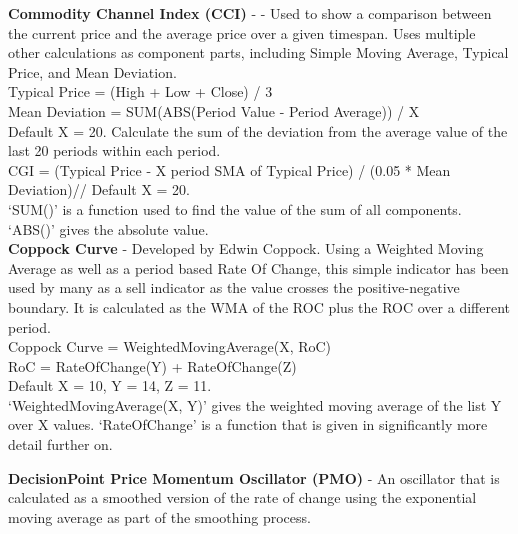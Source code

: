 \documentclass[conference]{IEEEtran}
\begin{document}

\noindent
\textbf{Commodity Channel Index (CCI)} - \cite{Lambert1980} - Used to show a comparison between the current price and the average price over a given timespan. Uses multiple other calculations as component parts, including Simple Moving Average, Typical Price, and Mean Deviation.\\

\noindent
Typical Price = (High + Low + Close) / 3\\

\noindent
Mean Deviation = SUM(ABS(Period Value - Period Average)) / X\\
Default X = 20. Calculate the sum of the deviation from the average value of the last 20 periods within each period. \\

\noindent
CGI = (Typical Price - X period SMA of Typical Price) / (0.05 * Mean Deviation)//
Default X = 20.\\

`SUM()' is a function used to find the value of the sum of all components. `ABS()' gives the absolute value.\\

\noindent
\textbf{Coppock Curve} - Developed by Edwin Coppock. Using a Weighted Moving Average as well as a period based Rate Of Change, this simple indicator has been used by many as a sell indicator as the value crosses the positive-negative boundary. It is calculated as the WMA of the ROC plus the ROC over a different period.\\

\noindent
Coppock Curve = WeightedMovingAverage(X, RoC)\\
RoC = RateOfChange(Y) + RateOfChange(Z)\\
Default X = 10, Y = 14, Z = 11. \\

`WeightedMovingAverage(X, Y)' gives the weighted moving average of the list Y over X values. `RateOfChange' is a function that is given in significantly more detail further on.

\noindent
\textbf{DecisionPoint Price Momentum Oscillator (PMO)} - An oscillator that is calculated as a smoothed version of the rate of change using the exponential moving average as part of the smoothing process. \\
\end{document}
